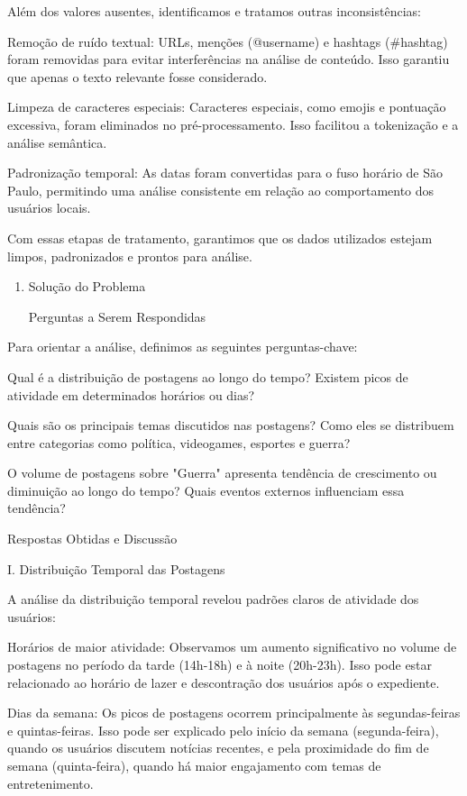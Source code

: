 \documentclass[
  letterpaper,
  DIV=11,
  numbers=noendperiod]{scrartcl}
\begin{document}
Além dos valores ausentes, identificamos e tratamos outras
inconsistências:

\begin{VerbatimWithBreaks}
Remoção de ruído textual:  URLs, menções (@username) e hashtags (#hashtag) foram removidas para evitar interferências na análise de conteúdo. Isso garantiu que apenas o texto relevante fosse considerado. 

Limpeza de caracteres especiais:  Caracteres especiais, como emojis e pontuação excessiva, foram eliminados no pré-processamento. Isso facilitou a tokenização e a análise semântica. 

Padronização temporal:  As datas foram convertidas para o fuso horário de São Paulo, permitindo uma análise consistente em relação ao comportamento dos usuários locais. 
 
\end{VerbatimWithBreaks}

Com essas etapas de tratamento, garantimos que os dados utilizados
estejam limpos, padronizados e prontos para análise.

\begin{enumerate}
\def\labelenumi{\alph{enumi}.}
\setcounter{enumi}{1}
\item
  Solução do Problema

  Perguntas a Serem Respondidas
\end{enumerate}

Para orientar a análise, definimos as seguintes perguntas-chave:

\begin{VerbatimWithBreaks}
Qual é a distribuição de postagens ao longo do tempo?  Existem picos de atividade em determinados horários ou dias? 

Quais são os principais temas discutidos nas postagens?  Como eles se distribuem entre categorias como política, videogames, esportes e guerra? 

O volume de postagens sobre "Guerra" apresenta tendência de crescimento ou diminuição ao longo do tempo?  Quais eventos externos influenciam essa tendência? 
 

Respostas Obtidas e Discussão 
 
\end{VerbatimWithBreaks}

  I. Distribuição Temporal das Postagens

A análise da distribuição temporal revelou padrões claros de atividade
dos usuários:

\begin{VerbatimWithBreaks}
Horários de maior atividade:  Observamos um aumento significativo no volume de postagens no período da tarde (14h-18h) e à noite (20h-23h). Isso pode estar relacionado ao horário de lazer e descontração dos usuários após o expediente. 

Dias da semana:  Os picos de postagens ocorrem principalmente às segundas-feiras e quintas-feiras. Isso pode ser explicado pelo início da semana (segunda-feira), quando os usuários discutem notícias recentes, e pela proximidade do fim de semana (quinta-feira), quando há maior engajamento com temas de entretenimento. 
 
\end{VerbatimWithBreaks}
\end{document}
